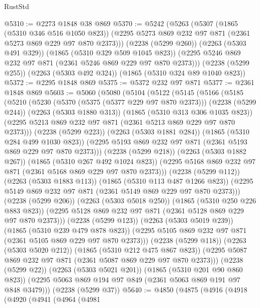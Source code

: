 \begin{lexlean}{RustStd}
\begin{coremodule}
@5310 := @2273 @1848 @38 @869
@5370 := @5242
    (@5263
      (@5307
        (@1865 (@5310 @346 @516 @1050 @823))
        (@2295 @5273 @869 @232 @97 @871 (@2361 @5273 @869 @229 @97 @870 @2373)))
      (@2238 (@5299 @260))
      (@2263 (@5303 @491 @329))
      (@1865 (@5310 @329 @509 @1045 @823))
      (@2295 @5246 @869 @232 @97 @871 (@2361 @5246 @869 @229 @97 @870 @2373)))
    (@2238 (@5299 @255))
    (@2263 (@5303 @492 @324))
    (@1865 (@5310 @324 @89 @1040 @823))
@5372 := @2295 @1848 @869
@5375 := @5372 @232 @97 @871
@5377 := @2361 @1848 @869
@5603 := @5060
    (@5080
      (@5104
        (@5122
          (@5145
            (@5166
              (@5185
                (@5210
                  (@5230
                    (@5370 (@5375 (@5377 @229 @97 @870 @2373)))
                    (@2238 (@5299 @244))
                    (@2263 (@5303 @1880 @313))
                    (@1865 (@5310 @313 @306 @1035 @823))
                    (@2295 @5213 @869 @232 @97 @871 (@2361 @5213 @869 @229 @97 @870 @2373)))
                  (@2238 (@5299 @223))
                  (@2263 (@5303 @1881 @284))
                  (@1865 (@5310 @284 @499 @1030 @823))
                  (@2295 @5193 @869 @232 @97 @871 (@2361 @5193 @869 @229 @97 @870 @2373)))
                (@2238 (@5299 @218))
                (@2263 (@5303 @1882 @267))
                (@1865 (@5310 @267 @492 @1024 @823))
                (@2295 @5168 @869 @232 @97 @871 (@2361 @5168 @869 @229 @97 @870 @2373)))
              (@2238 (@5299 @112))
              (@2263 (@5303 @1883 @113))
              (@1865 (@5310 @113 @487 @1266 @823))
              (@2295 @5149 @869 @232 @97 @871 (@2361 @5149 @869 @229 @97 @870 @2373)))
            (@2238 (@5299 @206))
            (@2263 (@5303 @5018 @250))
            (@1865 (@5310 @250 @226 @883 @823))
            (@2295 @5128 @869 @232 @97 @871 (@2361 @5128 @869 @229 @97 @870 @2373)))
          (@2238 (@5299 @123))
          (@2263 (@5303 @5019 @239))
          (@1865 (@5310 @239 @479 @878 @823))
          (@2295 @5105 @869 @232 @97 @871 (@2361 @5105 @869 @229 @97 @870 @2373)))
        (@2238 (@5299 @118))
        (@2263 (@5303 @5020 @212))
        (@1865 (@5310 @212 @475 @867 @823))
        (@2295 @5087 @869 @232 @97 @871 (@2361 @5087 @869 @229 @97 @870 @2373)))
      (@2238 (@5299 @22))
      (@2263 (@5303 @5021 @201))
      (@1865 (@5310 @201 @90 @860 @823))
      (@2295 @5063 @869 @194 @97 @849 (@2361 @5063 @869 @191 @97 @848 @3479)))
    (@2238 (@5299 @37))
@5640 := @4850
    (@4875
      (@4916
        (@4918
          (@4920
            (@4941
              (@4964
                (@4981

\end{coremodule}
\end{lexlean}
